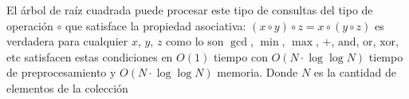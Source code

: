 El árbol de raíz cuadrada puede procesar este tipo de consultas del tipo de operación $\circ$ que satisface la propiedad asociativa: $(x \circ y) \circ z=x \circ (y \circ z)$ es verdadera para cualquier $x$, $y$, $z$ como lo son $\gcd$, $\min$, $\max$, $+$, $\text{and}$, $\text{or}$, $\text{xor}$, etc satisfacen estas condiciones en $O(1)$ tiempo con $O(N\cdot\log\log N)$ tiempo de preprocesamiento y $O(N\cdot\log\log N)$ memoria. Donde $N$ es la cantidad de elementos de la colección